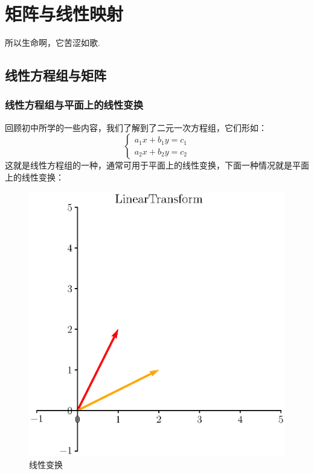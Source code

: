 \chapter{矩阵与线性映射}
\begin{center}
	\textcolor[RGB]{255, 0, 0}{\faHeart}所以生命啊，它苦涩如歌.\textcolor[RGB]{255, 0, 0}{\faHeart}
\end{center}
\vspace{-5pt}
\begin{center}
\end{center}

\section{线性方程组与矩阵}

\subsection{线性方程组与平面上的线性变换}

回顾初中所学的一些内容，我们了解到了二元一次方程组，它们形如：
$$\left\{\begin{matrix} 
	a_1x+b_1y=c_1 \\  
	a_2x+b_2y=c_2
  \end{matrix}\right. $$
这就是线性方程组的一种，通常可用于平面上的线性变换，下面一种情况就是平面上的线性变换：
\begin{figure}[htbp]
	\centering
	\includegraphics[width=0.7\linewidth]{figure/eps/LinearTransform.eps}
	\caption{线性变换}
	\label{fig:LinearTransform}
\end{figure}

